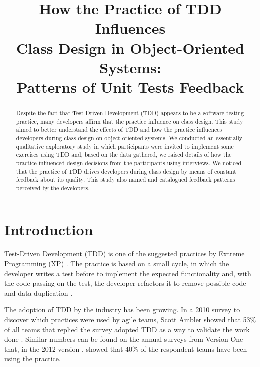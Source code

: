 \documentclass[conference]{IEEEtran}
\begin{document}
	
\title{How the Practice of TDD Influences \\Class Design in Object-Oriented Systems: \\Patterns of Unit Tests Feedback}

\author{
}

\maketitle

\begin{abstract} 
	Despite the fact that Test-Driven Development (TDD) appears to be a software testing practice, 
	many developers affirm that the practice influence on class design. This study aimed
	to better understand the effects of TDD and how the practice influences developers
	during class design on object-oriented systems. 
	We conducted an essentially qualitative exploratory study in which participants
	were invited to implement some exercises using TDD and, based on the data gathered,
	we raised details of how the practice influenced design decisions from the
	participants using interviews.
	We noticed that the practice of TDD drives
	developers during class design by means of constant feedback about its quality. This study
	also named and catalogued feedback patterns perceived by the developers.
\end{abstract}

\IEEEpeerreviewmaketitle

\section{Introduction}

Test-Driven Development (TDD) is one of the suggested practices
by Extreme Programming (XP) \cite{XPExplained}. The practice is based on
a small cycle, in which the developer writes a test before to implement
the expected functionality and, with the code passing on the
test, the developer refactors it to remove possible code 
and data duplication \cite{TDDByExample}.

The adoption of TDD by the industry has been growing. In a 2010 survey to discover
which practices were used by agile teams, Scott Ambler showed that 53\% of all teams
that replied the survey adopted TDD as a way to validate the work done
\cite{wambler-survey-agile}. Similar numbers can be found on the annual surveys from
Version One that, in the 2012 version \cite{versionone-2012}, showed that
40\% of the respondent teams have been using the practice.
\end{document}
